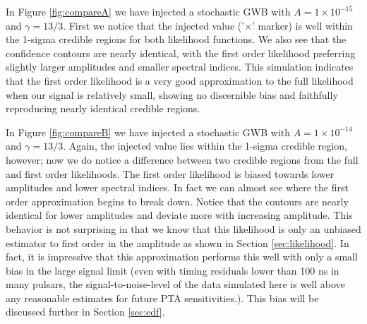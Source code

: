 \documentclass[iop]{emulateapj}
\begin{document}
 In Figure \ref{fig:compareA} we have injected a stochastic GWB with $A=1\times 10^{-15}$ and $\gamma=13/3$. First we notice that the injected value ('$\times$' marker) is well within the 1-sigma credible regions for both likelihood functions. We also see that the confidence contours are nearly identical, with the first order likelihood preferring slightly larger amplitudes and smaller spectral indices. This simulation indicates that the first order likelihood is a very good approximation to the full likelihood when our signal is relatively small, showing no discernible bias and faithfully reproducing nearly identical credible regions. 
 
 In Figure \ref{fig:compareB} we have injected a stochastic GWB with $A=1\times 10^{-14}$ and $\gamma=13/3$. Again, the injected value lies within the 1-sigma credible region, however; now we do notice a difference between two credible regions from the full and first order likelihoods. The first order likelihood is biased towards lower amplitudes and lower spectral indices. In fact we can almost see where the first order approximation begins to break down. Notice that the contours are nearly identical for lower amplitudes and deviate more with increasing amplitude. This behavior is not surprising in that we know that this likelihood is only an unbiased estimator to first order in the amplitude as shown in Section \ref{sec:likelihood}. In fact, it is impressive that this approximation performs this well with only a small bias in the large signal limit (even with timing residuals lower than 100 ns in many pulsars, the signal-to-noise-level of the data simulated here is well above any reasonable estimates for future PTA sensitivities.). This bias will be discussed further in Section \ref{sec:edf}.
 
\end{document}
